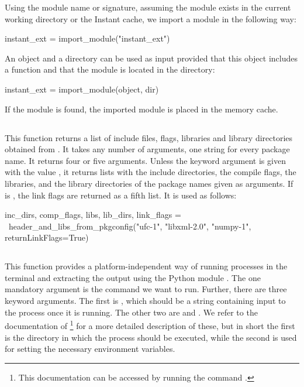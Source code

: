 Using the module name or signature, assuming the
module  exists in the current working directory or
the Instant cache, we import a module in the following way:
\begin{python}
instant_ext = import_module("instant_ext")
\end{python}
An object and a directory can be used as input provided that this object includes a
function  and that the module is located in the
directory:
\begin{python}
instant_ext = import_module(object, dir)
\end{python}
If the module is found, the imported module is placed in the memory cache.

\subsection[header\_and\_libs\_from\_pkgconfig]{}

This function returns a list of include files, flags, libraries and library
directories obtained from
. It takes any
number of arguments, one string for every package name.  It returns
four or five arguments. Unless the keyword
argument  is given with the value , it
returns lists with the include directories, the compile flags, the
libraries, and the library directories of the package names given as
arguments. If  is , the link flags are
returned as a fifth list.  It is used as follows:
\begin{python}
inc_dirs, comp_flags, libs, lib_dirs, link_flags = \
header_and_libs_from_pkgconfig("ufc-1", "libxml-2.0",
                               "numpy-1",
                               returnLinkFlags=True)
\end{python}

\subsection[get\_status\_output]{}

This function provides a platform-independent way of running processes
in the terminal and extracting the output using the Python
module . The one mandatory argument is the command we
want to run. Further, there are three keyword arguments. The first
is \emp{input}, which should be a string containing input to the
process once it is running. The other two are \emp{cwd}
and . We refer to the documentation
of \footnote{This documentation can be accessed by
running the command \emp{pydoc subprocess}.} for a more detailed
description of these, but in short the first is the directory in which
the process should be executed, while the second is used for setting
the necessary environment variables.

